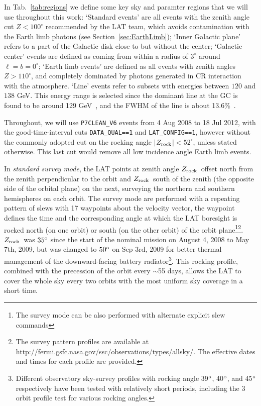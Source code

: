 \documentclass[aps,twocolumn,prd,superscriptaddress,showpacs,nofootinbib,fixfloat]{revtex4}
\newcommand{\degree}{^{\rm o}}
\newcommand{\zrock}{$Z_{\rm rock}$}
\begin{document}
In Tab.~\ref{tab:regions} we define some key sky and
paramter regions %
that we will use
throughout this work: `Standard events' are all events with
the zenith angle cut $Z<100^\circ$ recommended by the LAT
team, which
avoids contamination with the Earth limb photons (see
Section~\ref{sec:EarthLimb}); `Inner Galactic plane' refers to a part of the
Galactic disk close to but without the center;
`Galactic center' events are defined as coming from within
a radius of
$3^\circ$ around $\ell=b=0^\circ$; `Earth limb events' are
defined as all events with zenith angles $Z>110^\circ$, and
completely dominated by photons generated in CR interaction
with the atmosphere. `Line' events refer to subsets
with energies between $120$ and $138$ GeV. This energy range
is selected since the dominant line at the GC is found to be
around 129 GeV~\cite{linepaper}, and the FWHM of the line is
about 13.6\%~\cite{Weniger:2012}.

Throughout, we will use \texttt{P7CLEAN\_V6} events from 4
Aug 2008 to 18 Jul 2012, with the good-time-interval cuts
\texttt{DATA\_QUAL==1} and \texttt{LAT\_CONFIG==1}, however
without the commonly adopted cut on the rocking angle
$|$\zrock$|<52^\circ$, unless stated otherwise. This last cut would remove
all low incidence angle Earth limb events.
\medskip

In \emph{standard survey mode}, the LAT points at zenith
angle \zrock\ offset north from the zenith perpendicular to
the orbit and \zrock\ south of the zenith (the opposite side
of the orbital plane) on the next, surveying the northern
and southern hemispheres on each orbit. The survey mode are
performed with a repeating pattern of slews with 17
waypoints about the velocity vector, the waypoint defines
the time and the corresponding angle at which the LAT
boresight is rocked north (on one orbit) or south (on the
other orbit) of the orbit plane\footnote{The survey mode can
be also performed with alternate explicit slew
commands}\footnote{The survey pattern profiles are available
at
\url{http://fermi.gsfc.nasa.gov/ssc/observations/types/allsky/}.
The effective dates and times for each profile are provided.
}. \zrock\ was $35\degree$ since the start of the nominal
mission on August 4, 2008 to May 7th, 2009, but was changed
to $50\degree$ on Sep 3rd, 2009 for better thermal
management of the downward-facing battery
radiator\footnote{Different observatory sky-survey profiles
with rocking angle 39$\degree$, 40$\degree$, and 45$\degree$
respectively have been tested with relatively short periods,
including the 3 orbit profile test for various rocking
angles.}. This rocking profile, combined with the precession
of the orbit every $\sim$55 days, allows the LAT to cover
the whole sky every two orbits with the most uniform sky
coverage in a short time.
\end{document}
